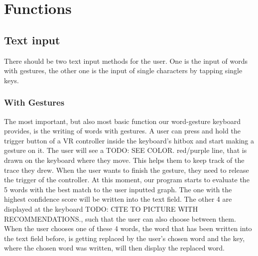 \section{Functions}
\subsection{Text input}
There should be two text input methods for the user. One is the input of words with gestures, the other one is the input of single characters by tapping single keys.
\subsubsection{With Gestures}
The most important, but also most basic function our word-gesture keyboard provides, is the writing of words with gestures. A user can press and hold the trigger button of a VR controller inside the keyboard's hitbox and start making a gesture on it. The user will see a TODO: SEE COLOR. red/purple line, that is drawn on the keyboard where they move. This helps them to keep track of the trace they drew. When the user wants to finish the gesture, they need to release the trigger of the controller. At this moment, our program starts to evaluate the 5 words with the best match to the user inputted graph. The one with the highest confidence score will be written into the text field. The other 4 are displayed at the keyboard TODO: CITE TO PICTURE WITH RECOMMENDATIONS., such that the user can also choose between them. When the user chooses one of these 4 words, the word that has been written into the text field before, is getting replaced by the user's chosen word and the key, where the chosen word was written, will then display the replaced word.\\
